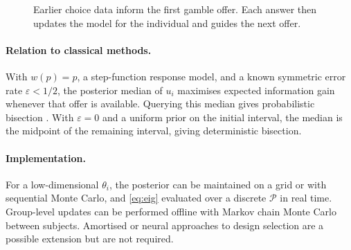 \documentclass[11pt,a4paper]{article}
\begin{document}
\begin{figure}[htbp]
\centering
{}
\caption{Earlier choice data inform the first gamble offer. Each answer then updates the model for the individual and guides the next offer.}
\label{fig:starting-offer}
\end{figure}

\paragraph{Relation to classical methods.}
With $w(p)=p$, a step-function response model, and a known symmetric error rate $\varepsilon<1/2$, the posterior median of $u_i$ maximises expected information gain whenever that offer is available. Querying this median gives probabilistic bisection \citep{waeber2013}. With $\varepsilon=0$ and a uniform prior on the initial interval, the median is the midpoint of the remaining interval, giving deterministic bisection.

\paragraph{Implementation.}
For a low-dimensional $\theta_i$, the posterior can be maintained on a grid or with sequential Monte Carlo, and \cref{eq:eig} evaluated over a discrete $\mathcal{P}$ in real time. Group-level updates can be performed offline with Markov chain Monte Carlo between subjects. Amortised or neural approaches to design selection are a possible extension but are not required.
\end{document}
